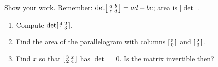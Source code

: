 \documentclass[10pt]{article}
\begin{document}
\begin{practicebox}
Show your work. Remember: $\det\begin{bsmallmatrix} a & b\\ c & d \end{bsmallmatrix}=ad-bc$; area is $|\det|$.
\begin{enumerate}[leftmargin=1.6em, itemsep=4pt]
  \item Compute $\det\begin{bsmallmatrix} 4 & 2\\ 1 & 3 \end{bsmallmatrix}$. \writeline
  \item Find the area of the parallelogram with columns $\begin{bsmallmatrix} 5\\0 \end{bsmallmatrix}$ and $\begin{bsmallmatrix} 2\\3 \end{bsmallmatrix}$. \writeline
  \item Find $x$ so that $\begin{bsmallmatrix} 3 & x\\ 2 & 4 \end{bsmallmatrix}$ has $\det=0$. Is the matrix invertible then? \writeline
\end{enumerate}
\end{practicebox}
\end{document}
